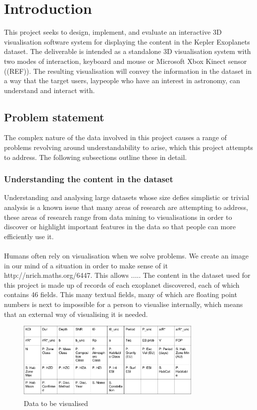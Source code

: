 \chapter{Introduction}\label{C:intro}
This project seeks to design, implement, and evaluate an interactive 3D visualisation software system for displaying the content in the Kepler Exoplanets dataset. The deliverable is intended as a standalone 3D visualisation system with two modes of interaction, keyboard and mouse or Microsoft Xbox Kinect sensor ((REF)). The resulting visualisation will convey the information in the dataset in a way that the target users, laypeople who have an interest in astronomy, can understand and interact with.

\section{Problem statement}
The complex nature of the data involved in this project causes a range of problems revolving around understandability to arise, which this project attempts to address. The following subsections outline these in detail.
\subsection{Understanding the content in the dataset}
Understanding and analysing large datasets whose size defies simplistic or trivial analysis is a known issue that many areas of research are attempting to address, these areas of research range from data mining to visualisations in order to discover or highlight important features in the data so that people can more efficiently use it. 
\\\\
Humans often rely on visualisation when we solve problems. We create an image in our mind of a situation in order to make sense of it http://nrich.maths.org/6447. This allows ..... The content in the dataset used for this project is made up of records of each exoplanet discovered, each of which contains 46 fields. This many textual fields, many of which are floating point numbers is next to impossible for a person to visualise internally, which means that an external way of visualising it is needed. 
\clearpage
\begin{figure}[h!]
  \centering
      \includegraphics[width=0.8\textwidth]{images/data.png}
  \caption{Data to be visualised}
\end{figure}

